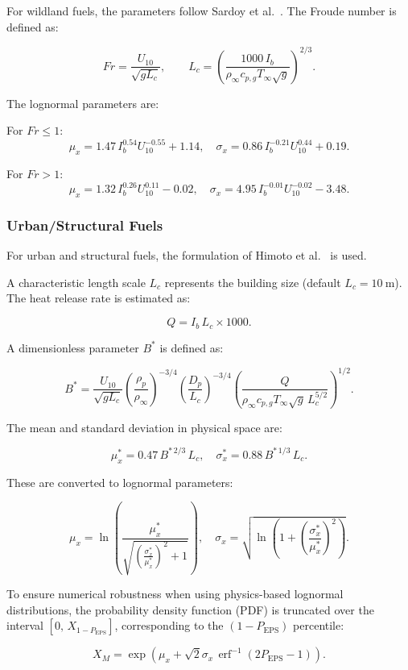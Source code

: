 For wildland fuels, the parameters follow Sardoy et al.~\cite{sardoyNumericalStudyGroundlevel2008}. The Froude number is defined as:

\[
Fr = \frac{U_{10}}{\sqrt{g L_c}}, 
\qquad 
L_c = \left(\frac{1000 \, I_b}{\rho_\infty c_{p,g} T_\infty \sqrt{g}}\right)^{2/3}.
\]

The lognormal parameters are:

For $Fr \le 1$:
\[
\mu_x = 1.47 \, I_b^{0.54} U_{10}^{-0.55} + 1.14,
\quad
\sigma_x = 0.86 \, I_b^{-0.21} U_{10}^{0.44} + 0.19.
\]

For $Fr > 1$:
\[
\mu_x = 1.32 \, I_b^{0.26} U_{10}^{0.11} - 0.02,
\quad
\sigma_x = 4.95 \, I_b^{-0.01} U_{10}^{-0.02} - 3.48.
\]

\subsubsection*{Urban/Structural Fuels}

For urban and structural fuels, the formulation of Himoto et al.~\cite{himotoTransportDiskshapedFirebrands2005} is used.

A characteristic length scale $L_c$ represents the building size (default $L_c = 10~\mathrm{m}$). The heat release rate is estimated as:

\[
Q = I_b \, L_c \times 1000.
\]

A dimensionless parameter $B^*$ is defined as:

\[
B^* = \frac{U_{10}}{\sqrt{g L_c}} 
\left(\frac{\rho_p}{\rho_\infty}\right)^{-3/4}
\left(\frac{D_p}{L_c}\right)^{-3/4}
\left(\frac{Q}{\rho_\infty c_{p,g} T_\infty \sqrt{g} \, L_c^{5/2}}\right)^{1/2}.
\]

The mean and standard deviation in physical space are:

\[
\mu_x^* = 0.47 \, B^{*\,2/3} \, L_c,
\quad
\sigma_x^* = 0.88 \, B^{*\,1/3} \, L_c.
\]

These are converted to lognormal parameters:

\[
\mu_x = \ln\!\left(\frac{\mu_x^*}{\sqrt{\left(\frac{\sigma_x^*}{\mu_x^*}\right)^2 + 1}}\right),
\quad
\sigma_x = \sqrt{\ln\!\left(1 + \left(\frac{\sigma_x^*}{\mu_x^*}\right)^2\right)}.
\]

To ensure numerical robustness when using physics-based lognormal distributions, the probability density function (PDF) is truncated over the interval $[0,\, X_{1 - P_{\text{EPS}}}]$, corresponding to the $(1 - P_{\text{EPS}})$ percentile:

\[
X_M = \exp\left(\mu_x + \sqrt{2}\sigma_x \, \operatorname{erf}^{-1}(2P_{\text{EPS}} - 1)\right).
\]

